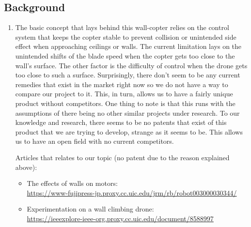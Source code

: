 \documentclass[12pt]{article}
\begin{document}
        \subsection{Background}
            \begin{enumerate}[label=\Alph*.]
                \item The basic concept that lays behind this wall-copter relies on the control system that keeps the copter stable to prevent collision or unintended side effect when approaching ceilings or walls. The current limitation lays on the unintended shifts of the blade speed when the copter gets too close to the wall's surface. The other factor is the difficulty of control when the drone gets too close to such a surface. Surprisingly, there don't seem to be any current remedies that exist in the market right now so we do not have a way to compare our project to it. This, in turn, allows us to have a fairly unique product without competitors. One thing to note is that this runs with the assumptions of there being no other similar projects under research. To our knowledge and research, there seems to be no patents that exist of this product that we are trying to develop, strange as it seems to be. This allows us to have an open field with no current competitors.
                
                Articles that relates to our topic (no patent due to the reason explained above): 
                \begin{itemize}[label=]
                    \item The effects of walls on motors:\\\url{https://www-fujipress-jp.proxy.cc.uic.edu/jrm/rb/robot003000030344/}
                    \item Experimentation on a wall climbing drone:\\\url{https://ieeexplore-ieee-org.proxy.cc.uic.edu/document/8588997}
                \end{itemize}


\end{enumerate}
\end{document}

